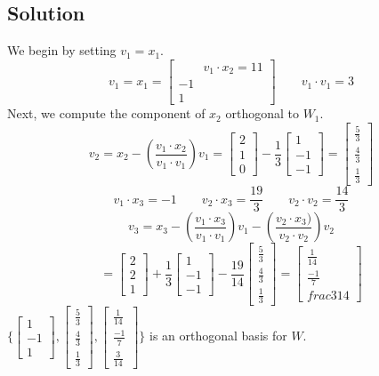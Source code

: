 \subsection*{Solution}
We begin by setting $v_1 = x_1$.
$$v_1 = x_1 = \begin{bmatrix} \qquad v_1\cdot x_2 = 1
    1\\-1\\1
\end{bmatrix} \qquad v_1\cdot v_1 = 3$$
Next, we compute the component of $x_2$ orthogonal to $W_1$.
$$v_2 = x_2 - (\frac{v_1\cdot x_2}{v_1\cdot v_1})v_1 = \begin{bmatrix}
    2\\1\\0
\end{bmatrix} - \frac{1}{3}\begin{bmatrix}
    1\\-1\\-1
\end{bmatrix} = \begin{bmatrix}
    \frac{5}{3}\\\frac{4}{3}\\\frac{1}{3}
\end{bmatrix}$$
$$v_1\cdot x_3 = -1\qquad v_2\cdot x_3 = \frac{19}{3}\qquad v_2\cdot v_2 = \frac{14}{3}$$
$$v_3 = x_3 - (\frac{v_1\cdot x_3}{v_1\cdot v_1})v_1 - (\frac{v_2\cdot x_3)}{v_2\cdot v_2})v_2$$
$$= \begin{bmatrix}
    2\\2\\1
\end{bmatrix} + \frac{1}{3}\begin{bmatrix}
    1\\-1\\-1
\end{bmatrix} - \frac{19}{14}\begin{bmatrix}
    \frac{5}{3}\\\frac{4}{3}\\\frac{1}{3}
\end{bmatrix} = \begin{bmatrix}
    \frac{1}{14}\\\frac{-1}{7}\\frac{3}{14}
\end{bmatrix}$$
$\{\begin{bmatrix}
    1\\-1\\1
\end{bmatrix}, \begin{bmatrix}
    \frac{5}{3}\\\frac{4}{3}\\\frac{1}{3}
\end{bmatrix}, \begin{bmatrix}
    \frac{1}{14}\\\frac{-1}{7}\\\frac{3}{14}
\end{bmatrix}\}$ is an orthogonal basis for $W$.


